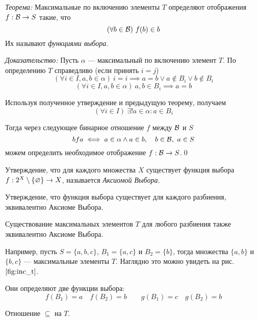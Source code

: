\vspace{1em}
{\it Теорема:} Максимальные по включению элементы $T$ определяют
отображения $f:\mathcal B\to S$ такие, что
\[
	(\forall b\in\mathcal B)~f(b)\in b
\]
Их называют {\it функциями выбора}.

{\it Доказательство:} Пусть $\alpha$ --- максимальный по включению
элемент $T$.
По определению $T$ справедливо (если принять $i=j$)
\[
	(\forall i\in I,a,b\in\alpha)~i=i\implies a=b\lor a\notin B_{i}\lor b\notin B_{i}
\]
\[
	(\forall i\in I,a,b\in\alpha)~a,b\in B_{i}\implies a=b
\]

Используя полученное утверждение и предыдущую теорему, получаем
\[
	(\forall i\in I)~\exists !a\in\alpha:a\in B_{i}
\]

Тогда через следующее бинарное отношение $f$ между $\mathcal B$ и $S$
\[
	bfa\iff a\in \alpha\land a\in b,\quad b\in\mathcal B,~a\in S
\]
можем определить необходимое отображение $f:\mathcal B\to S$.\qed

Утверждение, что для каждого множества $X$ существует функция
выбора $f:2^{X}\setminus\{\varnothing\}\to X$,
называется {\it Аксиомой Выбора}.

Утверждение, что функция выбора существует для каждого разбиения,
эквивалентно Аксиоме Выбора.

Существование максимальных элементов $T$ для любого
разбиения также эквивалентно Аксиоме Выбора.

Например, пусть $S=\{a,b,c\}$, $B_1=\{a,c\}$ и $B_2=\{b\}$, тогда
множества $\{a,b\}$ и $\{b,c\}$ --- максимальные элементы $T$.
Наглядно это можно увидеть на рис. $\ref{fig:inc_t}$.

Они определяют две функции выбора:
\[
	f(B_1)=a\quad f(B_2)=b\qquad g(B_1)=c\quad g(B_2)=b
\]

\begin{marginfigure}
	\center

	\caption{Отношение $\subseteq$ на $T$.}\label{fig:inc_t}
\end{marginfigure}


